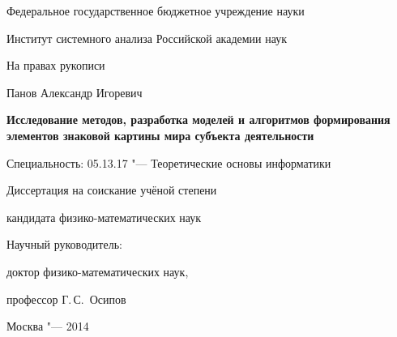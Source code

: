 \thispagestyle{empty}

\begin{center}
Федеральное государственное бюджетное учреждение науки\par
Институт системного анализа Российской академии наук\par 
\par
\end{center}

\vspace{10mm}
\begin{flushright}
На правах рукописи
\end{flushright}

\vspace{15mm}
\begin{center}
{\large Панов Александр Игоревич}
\end{center}

\vspace{5mm}
\begin{center}
{\bfseries\Large Исследование методов, разработка моделей и алгоритмов формирования элементов знаковой картины мира субъекта деятельности
\par}

\vspace{10mm}
{%
Специальность: 05.13.17 "--- Теоретические основы информатики
}

\vspace{5mm}
Диссертация на соискание учёной степени

кандидата физико-математических наук
\end{center}

\vspace{30mm}
\begin{flushright}
Научный руководитель:

доктор физико-математических наук,

профессор Г.\,С.~Осипов

\end{flushright}

\vspace{20mm}
\begin{center}
{Москва "--- 2014}
\end{center}

\newpage
